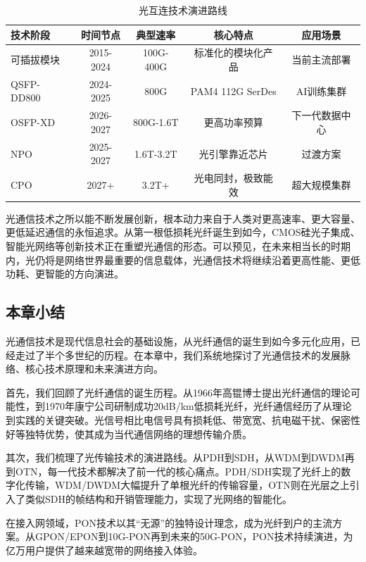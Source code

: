 \begin{table}[htbp]
\centering
\caption{光互连技术演进路线}
\begin{tabular}{|l|c|c|c|c|}
\hline
\textbf{技术阶段} & \textbf{时间节点} & \textbf{典型速率} & \textbf{核心特点} & \textbf{应用场景} \\
\hline
可插拔模块 & 2015-2024 & 100G-400G & 标准化的模块化产品 & 当前主流部署 \\
\hline
QSFP-DD800 & 2024-2025 & 800G & PAM4 112G SerDes & AI训练集群 \\
\hline
OSFP-XD & 2026-2027 & 800G-1.6T & 更高功率预算 & 下一代数据中心 \\
\hline
NPO & 2025-2027 & 1.6T-3.2T & 光引擎靠近芯片 & 过渡方案 \\
\hline
CPO & 2027+ & 3.2T+ & 光电同封，极致能效 & 超大规模集群 \\
\hline
\end{tabular}
\end{table}

光通信技术之所以能不断发展创新，根本动力来自于人类对更高速率、更大容量、更低延迟通信的永恒追求。从第一根低损耗光纤诞生到如今，CMOS硅光子集成、智能光网络等创新技术正在重塑光通信的形态。可以预见，在未来相当长的时期内，光仍将是网络世界最重要的信息载体，光通信技术将继续沿着更高性能、更低功耗、更智能的方向演进。

\subsection{本章小结}

光通信技术是现代信息社会的基础设施，从光纤通信的诞生到如今多元化应用，已经走过了半个多世纪的历程。在本章中，我们系统地探讨了光通信技术的发展脉络、核心技术原理和未来演进方向。

首先，我们回顾了光纤通信的诞生历程。从1966年高锟博士提出光纤通信的理论可能性，到1970年康宁公司研制成功20dB/km低损耗光纤，光纤通信经历了从理论到实践的关键突破。光信号相比电信号具有损耗低、带宽宽、抗电磁干扰、保密性好等独特优势，使其成为当代通信网络的理想传输介质。

其次，我们梳理了光传输技术的演进路线。从PDH到SDH，从WDM到DWDM再到OTN，每一代技术都解决了前一代的核心痛点。PDH/SDH实现了光纤上的数字化传输，WDM/DWDM大幅提升了单根光纤的传输容量，OTN则在光层之上引入了类似SDH的帧结构和开销管理能力，实现了光网络的智能化。

在接入网领域，PON技术以其“无源”的独特设计理念，成为光纤到户的主流方案。从GPON/EPON到10G-PON再到未来的50G-PON，PON技术持续演进，为亿万用户提供了越来越宽带的网络接入体验。

